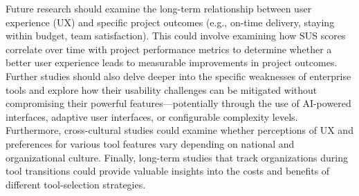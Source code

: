 \documentclass[runningheads]{llncs}
\begin{document}
Future research should examine the long-term relationship between user experience (UX) and specific project outcomes (e.g., on-time delivery, staying within budget, team satisfaction). This could involve examining how SUS scores correlate over time with project performance metrics to determine whether a better user experience leads to measurable improvements in project outcomes. Further studies should also delve deeper into the specific weaknesses of enterprise tools and explore how their usability challenges can be mitigated without compromising their powerful features—potentially through the use of AI-powered interfaces, adaptive user interfaces, or configurable complexity levels. Furthermore, cross-cultural studies could examine whether perceptions of UX and preferences for various tool features vary depending on national and organizational culture. Finally, long-term studies that track organizations during tool transitions could provide valuable insights into the costs and benefits of different tool-selection strategies.



\end{document}
